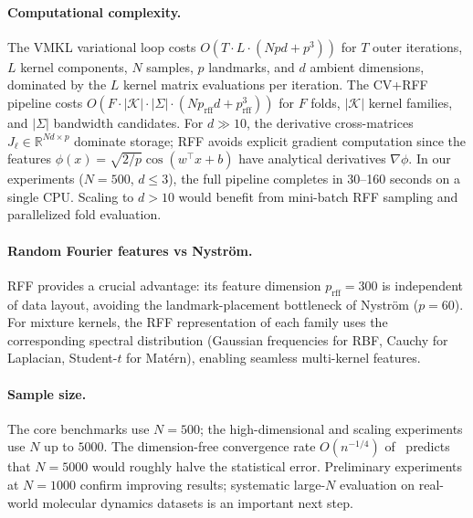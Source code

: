 \documentclass[11pt]{article}
\theoremstyle{remark}
\begin{document}
\paragraph{Computational complexity.}
The VMKL variational loop costs $O(T \cdot L \cdot (Npd + p^3))$ for $T$ outer iterations, $L$ kernel components, $N$ samples, $p$ landmarks, and $d$ ambient dimensions, dominated by the $L$ kernel matrix evaluations per iteration.
The CV+RFF pipeline costs $O(F \cdot |\mathcal{K}| \cdot |\Sigma| \cdot (N p_{\mathrm{rff}} d + p_{\mathrm{rff}}^3))$ for $F$ folds, $|\mathcal{K}|$ kernel families, and $|\Sigma|$ bandwidth candidates.
For $d\gg 10$, the derivative cross-matrices $J_\ell\in\mathbb{R}^{Nd\times p}$ dominate storage; RFF avoids explicit gradient computation since the features $\phi(x)=\sqrt{2/p}\cos(w^\top x+b)$ have analytical derivatives $\nabla\phi$.
In our experiments ($N=500$, $d\le 3$), the full pipeline completes in 30--160 seconds on a single CPU.
Scaling to $d>10$ would benefit from mini-batch RFF sampling and parallelized fold evaluation.

\paragraph{Random Fourier features vs Nystr\"om.}
RFF provides a crucial advantage: its feature dimension $p_{\mathrm{rff}}=300$ is independent of data layout, avoiding the landmark-placement bottleneck of Nystr\"om ($p=60$).
For mixture kernels, the RFF representation of each family uses the corresponding spectral distribution (Gaussian frequencies for RBF, Cauchy for Laplacian, Student-$t$ for Mat\'ern), enabling seamless multi-kernel features.

\paragraph{Sample size.}
The core benchmarks use $N=500$; the high-dimensional and scaling experiments use $N$ up to $5000$.
The dimension-free convergence rate $O(n^{-1/4})$ of~\citet{pmlr-v195-pillaud-vivien23a} predicts that $N=5000$ would roughly halve the statistical error.
Preliminary experiments at $N=1000$ confirm improving results; systematic large-$N$ evaluation on real-world molecular dynamics datasets is an important next step.
\end{document}
